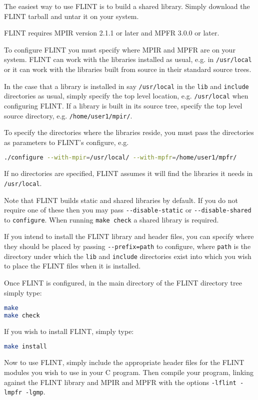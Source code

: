 \documentclass[a4paper,10pt]{book}
\newcommand{\code}{\lstinline}
\begin{document}
The easiest way to use FLINT is to build a shared library.  Simply download 
the FLINT tarball and untar it on your system.

FLINT requires MPIR version 2.1.1 or later and MPFR 3.0.0 or later.

To configure FLINT you must specify where MPIR and MPFR are on
your system. FLINT can work with the libraries installed as usual,
e.g. in \code{/usr/local} or it can work with the libraries built
from source in their standard source trees. 

In the case that a library is installed in say \code{/usr/local}
in the \code{lib} and \code{include} directories as usual, simply
specify the top level location, e.g. \code{/usr/local} when 
configuring FLINT. If a library is built in its source tree,
specify the top level source directory, e.g. \code{/home/user1/mpir/}.

To specify the directories where the libraries reside, you must
pass the directories as parameters to FLINT's configure, e.g.\ 
\begin{lstlisting}[language=bash]
./configure --with-mpir=/usr/local/ --with-mpfr=/home/user1/mpfr/
\end{lstlisting}
If no directories are specified, FLINT assumes it will find the
libraries it needs in \code{/usr/local}.

Note that FLINT builds static and shared libraries by default. If
you do not require one of these then you may pass 
\code{--disable-static} or \code{--disable-shared} to 
\code{configure}. When running \code{make check} a shared library
is required.

If you intend to install the FLINT library and header files, 
you can specify where they should be placed by passing 
\code{--prefix=path} to configure, where \code{path} is the directory
under which the \code{lib} and \code{include} directories exist into
which you wish to place the FLINT files when it is installed.

Once FLINT is configured, in the main directory of the FLINT directory 
tree simply type:
\begin{lstlisting}[language=bash]
make
make check
\end{lstlisting}

If you wish to install FLINT, simply type:
\begin{lstlisting}[language=bash]
make install
\end{lstlisting}

Now to use FLINT, simply include the appropriate header files for 
the FLINT modules you wish to use in your C program.  Then compile 
your program, linking against the FLINT library and MPIR and MPFR 
with the options \code{-lflint -lmpfr -lgmp}.
\end{document}
